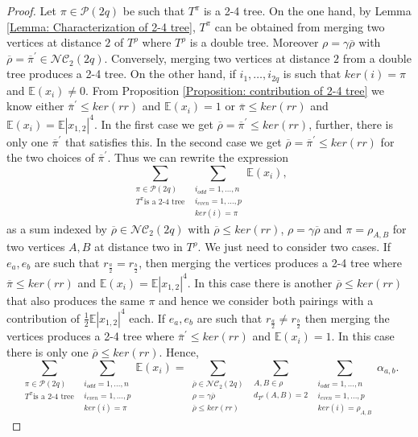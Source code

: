 \documentclass[10pt,a4paper]{amsart}
\newcommand{\E}{\mathbb{E}}
\newcommand{\NC}{\mathcal{NC}}
\newcommand{\cP}{\mathcal{P}}
\begin{document}
\begin{proof}
Let $\pi\in \cP(2q)$ be such that $T^\pi$ is a 2-4 tree. On the one hand, by Lemma \ref{Lemma: Characterization of 2-4 tree}, $T^\pi$ can be obtained from merging two vertices at distance $2$ of $T^\rho$ where $T^\rho$ is a double tree. Moreover $\rho=\gamma\overline{\rho}$ with $\overline{\rho}=\overline{\pi}^\prime \in \NC_2(2q)$. Conversely, merging two vertices at distance $2$ from a double tree produces a 2-4 tree. 
On the other hand, if $i_1,\dots,i_{2q}$ is such that $ker(i)=\pi$ and $\E(x_i)\neq 0$. From Proposition \ref{Proposition: contribution of 2-4 tree} we know either $\overline{\pi}^\prime \leq ker(rr)$ and $\E(x_i)=1$ or $\overline{\pi}\leq ker(rr)$ and $\E(x_i)=\E|x_{1,2}|^4$. In the first case we get $\overline{\rho}=\overline{\pi}^\prime \leq ker(rr)$, further, there is only one $\overline{\pi}^\prime$ that satisfies this. In the second case we get $\overline{\rho}=\overline{\pi}^\prime \leq ker(rr)$ for the two choices of $\overline{\pi}^\prime$. Thus we can rewrite the expression
$$\sum_{\substack{\pi\in \cP(2q)\\ T^\pi \text{is a 2-4 tree} }}\sum_{\substack{i_{odd}=1,\dots,n \\ i_{even}=1,\dots,p \\ ker(i)=\pi}}\E(x_i),$$
as a sum indexed by $\overline{\rho}\in \NC_2(2q)$ with $\overline{\rho}\leq ker(rr)$, $\rho=\gamma\overline{\rho}$ and $\pi=\rho_{A,B}$ for two vertices $A,B$ at distance two in $T^\rho$. We just need to consider two cases. If $e_a,e_b$ are such that $r_{\frac{a}{2}}=r_{\frac{b}{2}}$, then merging the vertices produces a 2-4 tree where $\overline{\pi}\leq ker(rr)$ and $\E(x_i)=\E|x_{1,2}|^4$. In this case there is another $\overline{\rho} \leq ker(rr)$ that also produces the same $\pi$ and hence we consider both pairings with a contribution of $\frac{1}{2}\E|x_{1,2}|^4$ each. If $e_a,e_b$ are such that $r_{\frac{a}{2}} \neq r_{\frac{b}{2}}$ then merging the vertices produces a 2-4 tree where $\overline{\pi}^\prime \leq ker(rr)$ and $\E(x_i)=1$. In this case there is only one $\overline{\rho} \leq ker(rr)$. Hence,
\begin{equation*}
\sum_{\substack{\pi\in \cP(2q)\\ T^\pi \text{is a 2-4 tree} }}\sum_{\substack{i_{odd}=1,\dots,n \\ i_{even}=1,\dots,p \\ ker(i)=\pi}}\E(x_i)= \sum_{\substack{\overline{\rho}\in \NC_2(2q) \\ \rho=\gamma\overline{\rho} \\ \overline{\rho}\leq ker(rr)}}\sum_{\substack{A,B\in\rho \\ d_{T^\rho}(A,B)=2}}\sum_{\substack{i_{odd}=1,\dots,n \\ i_{even}=1,\dots,p \\ ker(i)=\rho_{A,B}}}\alpha_{a,b}.

\end{equation*}
\end{proof}
\end{document}

